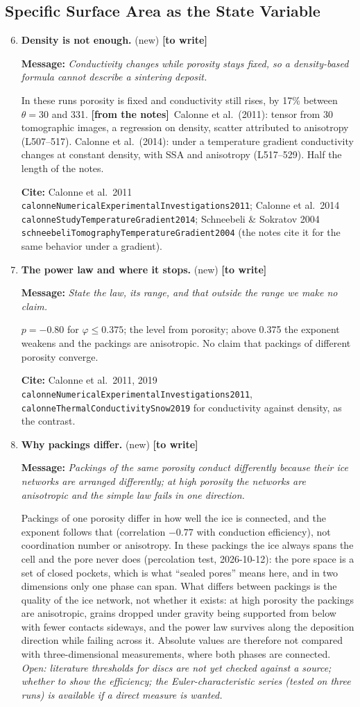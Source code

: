 \documentclass[11pt]{article}
\newcommand{\Open}[1]{\textcolor{open}{\textit{Open: #1}}}
\newcommand{\Miss}{\textcolor{miss}{\textbf{[to write]}}\ }
\newcommand{\Note}{\textcolor{open}{\textbf{[from the notes]}}\ }
\newcommand{\Cite}[1]{\par{\footnotesize\raggedright\textcolor{have}{\textbf{Cite:}} #1\par}}
\newcommand{\Msg}[1]{\par\textcolor{open}{\textbf{Message:}} \textit{#1}\par}
\newcommand{\New}[1]{\textbf{#1} \textnormal{\small(new)}}
\begin{document}
\subsection{Specific Surface Area as the State Variable}
\begin{enumerate}
\setcounter{enumi}{5}
\item \New{Density is not enough.} \Miss
  \Msg{Conductivity changes while porosity stays fixed, so a density-based formula cannot describe a sintering deposit.}
  In these runs porosity is fixed and
  conductivity still rises, by 17\% between $\theta = 30$ and 331. \Note Calonne et al.\ (2011): tensor from
  30 tomographic images, a regression on density, scatter attributed to
  anisotropy (L507--517). Calonne et al.\ (2014): under a temperature
  gradient conductivity changes at constant density, with SSA and anisotropy
  (L517--529). Half the length of the notes.
  \Cite{Calonne et al.\ 2011 \texttt{calonneNumericalExperimentalInvestigations2011}; Calonne et al.\ 2014 \texttt{calonneStudyTemperatureGradient2014}; Schneebeli \& Sokratov 2004 \texttt{schneebeliTomographyTemperatureGradient2004} (the notes cite it for the same behavior under a gradient).}
\item \New{The power law and where it stops.} \Miss
  \Msg{State the law, its range, and that outside the range we make no claim.}
  $p = -0.80$ for
  $\varphi \le 0.375$; the level from porosity; above 0.375 the exponent
  weakens and the packings are anisotropic. No claim that packings of
  different porosity converge.
  \Cite{Calonne et al.\ 2011, 2019 \texttt{calonneNumericalExperimentalInvestigations2011}, \texttt{calonneThermalConductivitySnow2019} for conductivity against density, as the contrast.}
\item \New{Why packings differ.} \Miss
  \Msg{Packings of the same porosity conduct differently because their ice networks are arranged differently; at high porosity the networks are anisotropic and the simple law fails in one direction.}
  Packings of one porosity differ in
  how well the ice is connected, and the exponent follows that (correlation
  $-0.77$ with conduction efficiency), not coordination number or
  anisotropy. In these packings the ice always spans the cell and the pore
  never does (percolation test, 2026-10-12): the pore space is a set of
  closed pockets, which is what ``sealed pores'' means here, and in two
  dimensions only one phase can span. What differs between packings is the
  quality of the ice network, not whether it exists: at high porosity the
  packings are anisotropic, grains dropped under gravity being supported
  from below with fewer contacts sideways, and the power law survives along
  the deposition direction while failing across it. Absolute values are
  therefore not compared with three-dimensional measurements, where both
  phases are connected.
  \Open{literature thresholds for discs are not yet checked against a
  source; whether to show the efficiency; the Euler-characteristic series
  (tested on three runs) is available if a direct measure is wanted.}
\end{enumerate}
\end{document}
